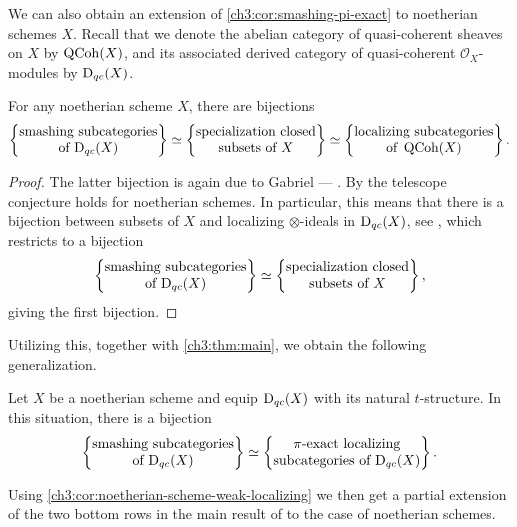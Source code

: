 We can also obtain an extension of \cref{ch3:cor:smashing-pi-exact} to noetherian schemes $X$. Recall that we denote the abelian category of quasi-coherent sheaves on $X$ by $\operatorname{QCoh}(X)$, and its associated derived category of quasi-coherent $\mathcal{O}_X$-modules by $\mathrm{D}_{qc}(X)$. 

\begin{lemma}
    For any noetherian scheme $X$, there are bijections
    \[\left\{ \begin{matrix} \text{smashing subcategories}\\ \text{of }\mathrm{D}_{qc}(X) \end{matrix} \right\}\simeq \left\{ \begin{matrix} \text{specialization closed}\\ \text{subsets of }X \end{matrix} \right\} \simeq \left\{ \begin{matrix} \text{localizing subcategories}\\ \text{of }\operatorname{QCoh}(X) \end{matrix} \right\}.\]
\end{lemma}
\begin{proof}
    The latter bijection is again due to Gabriel --- \cite[VI.2.4(b)]{gabriel_1962}. By \cite[4.13]{tarrio-lopez-salorio_2004} the telescope conjecture holds for noetherian schemes. In particular, this means that there is a bijection between subsets of $X$ and localizing $\otimes$-ideals in $\mathrm{D}_{qc}(X)$, see \cite[8.13]{stevenson_2013}, which restricts to a bijection
    \[\left\{ \begin{matrix} \text{smashing subcategories}\\ \text{of }\mathrm{D}_{qc}(X) \end{matrix} \right\}\simeq \left\{ \begin{matrix} \text{specialization closed}\\ \text{subsets of }X \end{matrix} \right\},\]
    giving the first bijection. 
\end{proof}

Utilizing this, together with \cref{ch3:thm:main}, we obtain the following generalization. 

\begin{corollary}
    Let $X$ be a noetherian scheme and equip $\mathrm{D}_{qc}(X)$ with its natural $t$-structure. In this situation, there is a bijection
    \[\left\{ \begin{matrix} \text{smashing subcategories}\\ \text{of }\mathrm{D}_{qc}(X) \end{matrix} \right\} \simeq \left\{ \begin{matrix} \pi\text{-exact localizing}\\ \text{subcategories of }\mathrm{D}_{qc}(X) \end{matrix} \right\}.\]
\end{corollary}

Using \cref{ch3:cor:noetherian-scheme-weak-localizing} we then get a partial extension of the two bottom rows in the main result of \cite{takahashi_2009} to the case of noetherian schemes.  

\begin{center}
\end{center}

